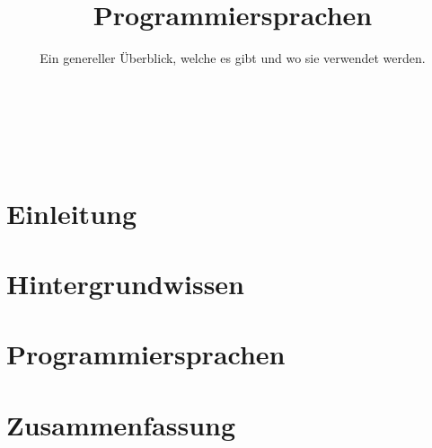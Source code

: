 


\title{Programmiersprachen}
\subtitle{Ein genereller Überblick, welche es gibt und wo sie verwendet werden.}




\backgroundTitle
\begin{frame}
    \thispagestyle{empty}
    \begin{columns}
        \column{0.6\paperwidth}
        \color{hhuBlau}
        \LARGE \inserttitle\\[\baselineskip]
        \large \insertauthor
    \end{columns}
\end{frame}
\backgroundNormal

\section{Einleitung}



\section{Hintergrundwissen}





\section{Programmiersprachen}



\section{Zusammenfassung}







